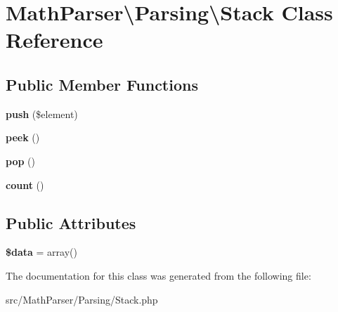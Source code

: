 \hypertarget{classMathParser_1_1Parsing_1_1Stack}{\section{Math\-Parser\textbackslash{}Parsing\textbackslash{}Stack Class Reference}
\label{classMathParser_1_1Parsing_1_1Stack}
}
\subsection*{Public Member Functions}
\begin{DoxyCompactItemize}
\item 
\hypertarget{classMathParser_1_1Parsing_1_1Stack_a50f3a135fdf9401b17494c50652b152a}{{\bfseries push} (\$element)}\label{classMathParser_1_1Parsing_1_1Stack_a50f3a135fdf9401b17494c50652b152a}

\item 
\hypertarget{classMathParser_1_1Parsing_1_1Stack_a13b5dc80388b7900af165e0822ebec93}{{\bfseries peek} ()}\label{classMathParser_1_1Parsing_1_1Stack_a13b5dc80388b7900af165e0822ebec93}

\item 
\hypertarget{classMathParser_1_1Parsing_1_1Stack_a23eff250a1077d7a9838a88e6755a84a}{{\bfseries pop} ()}\label{classMathParser_1_1Parsing_1_1Stack_a23eff250a1077d7a9838a88e6755a84a}

\item 
\hypertarget{classMathParser_1_1Parsing_1_1Stack_ad85713b07820a24a6e781b32e18271e6}{{\bfseries count} ()}\label{classMathParser_1_1Parsing_1_1Stack_ad85713b07820a24a6e781b32e18271e6}

\end{DoxyCompactItemize}
\subsection*{Public Attributes}
\begin{DoxyCompactItemize}
\item 
\hypertarget{classMathParser_1_1Parsing_1_1Stack_ab508efbeda55b29432f6aefbb591ca10}{{\bfseries \$data} = array()}\label{classMathParser_1_1Parsing_1_1Stack_ab508efbeda55b29432f6aefbb591ca10}

\end{DoxyCompactItemize}


The documentation for this class was generated from the following file\-:\begin{DoxyCompactItemize}
\item 
src/\-Math\-Parser/\-Parsing/Stack.\-php\end{DoxyCompactItemize}
